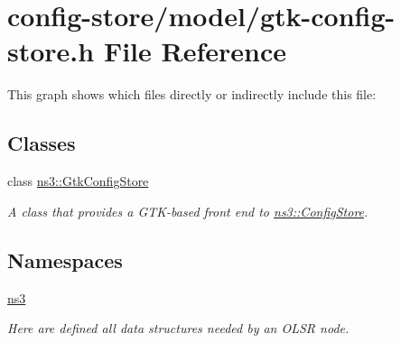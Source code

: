 \hypertarget{gtk-config-store_8h}{}\section{config-\/store/model/gtk-\/config-\/store.h File Reference}
\label{gtk-config-store_8h}
This graph shows which files directly or indirectly include this file\+:
\subsection*{Classes}
\begin{DoxyCompactItemize}
\item 
class \hyperlink{classns3_1_1GtkConfigStore}{ns3\+::\+Gtk\+Config\+Store}
\begin{DoxyCompactList}\small\item\em A class that provides a G\+T\+K-\/based front end to \hyperlink{classns3_1_1ConfigStore}{ns3\+::\+Config\+Store}. \end{DoxyCompactList}\end{DoxyCompactItemize}
\subsection*{Namespaces}
\begin{DoxyCompactItemize}
\item 
 \hyperlink{namespacens3}{ns3}
\begin{DoxyCompactList}\small\item\em Here are defined all data structures needed by an O\+L\+SR node. \end{DoxyCompactList}\end{DoxyCompactItemize}
